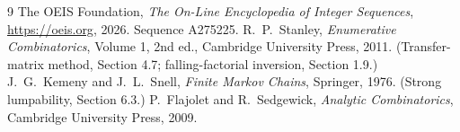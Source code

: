 \documentclass[11pt,a4paper]{article}
\theoremstyle{plain}
\theoremstyle{definition}
\begin{document}
\begin{thebibliography}{9}
 The OEIS Foundation, \emph{The On-Line Encyclopedia of Integer
Sequences}, \url{https://oeis.org}, 2026. Sequence A275225.
 R.~P.~Stanley, \emph{Enumerative Combinatorics}, Volume 1, 2nd ed.,
Cambridge University Press, 2011. (Transfer-matrix method, Section 4.7; falling-factorial
inversion, Section 1.9.)
 J.~G.~Kemeny and J.~L.~Snell, \emph{Finite Markov Chains}, Springer,
1976. (Strong lumpability, Section 6.3.)
 P.~Flajolet and R.~Sedgewick, \emph{Analytic Combinatorics}, Cambridge
University Press, 2009.
\end{thebibliography}
\end{document}
